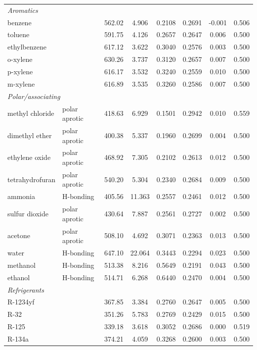 \begin{table}[H]
\begin{tabular}{llcccccc}
\multicolumn{8}{l}{\emph{Aromatics}} \\
benzene &  & 562.02 & 4.906 & 0.2108 & 0.2691 & -0.001 & 0.506 \\
toluene &  & 591.75 & 4.126 & 0.2657 & 0.2647 & 0.006 & 0.500 \\
ethylbenzene &  & 617.12 & 3.622 & 0.3040 & 0.2576 & 0.003 & 0.500 \\
o-xylene &  & 630.26 & 3.737 & 0.3120 & 0.2657 & 0.007 & 0.500 \\
p-xylene &  & 616.17 & 3.532 & 0.3240 & 0.2559 & 0.010 & 0.500 \\
m-xylene &  & 616.89 & 3.535 & 0.3260 & 0.2586 & 0.007 & 0.500 \\
\multicolumn{8}{l}{\emph{Polar/associating}} \\
methyl chloride & polar aprotic & 418.63 & 6.929 & 0.1501 & 0.2942 & 0.010 & 0.559 \\
dimethyl ether & polar aprotic & 400.38 & 5.337 & 0.1960 & 0.2699 & 0.004 & 0.500 \\
ethylene oxide & polar aprotic & 468.92 & 7.305 & 0.2102 & 0.2613 & 0.012 & 0.500 \\
tetrahydrofuran & polar aprotic & 540.20 & 5.304 & 0.2340 & 0.2684 & 0.009 & 0.500 \\
ammonia & H-bonding & 405.56 & 11.363 & 0.2557 & 0.2461 & 0.012 & 0.500 \\
sulfur dioxide & polar aprotic & 430.64 & 7.887 & 0.2561 & 0.2727 & 0.002 & 0.500 \\
acetone & polar aprotic & 508.10 & 4.692 & 0.3071 & 0.2363 & 0.013 & 0.500 \\
water & H-bonding & 647.10 & 22.064 & 0.3443 & 0.2294 & 0.023 & 0.500 \\
methanol & H-bonding & 513.38 & 8.216 & 0.5649 & 0.2191 & 0.043 & 0.500 \\
ethanol & H-bonding & 514.71 & 6.268 & 0.6440 & 0.2470 & 0.004 & 0.500 \\
\multicolumn{8}{l}{\emph{Refrigerants}} \\
R-1234yf &  & 367.85 & 3.384 & 0.2760 & 0.2647 & 0.005 & 0.500 \\
R-32 &  & 351.26 & 5.783 & 0.2769 & 0.2429 & 0.015 & 0.500 \\
R-125 &  & 339.18 & 3.618 & 0.3052 & 0.2686 & 0.000 & 0.519 \\
R-134a &  & 374.21 & 4.059 & 0.3268 & 0.2600 & 0.003 & 0.500 \\
\bottomrule
\end{tabular}
\end{table}
